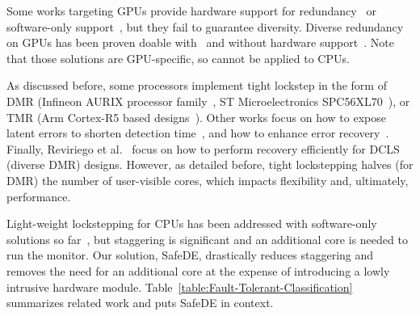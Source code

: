 Some works targeting GPUs provide hardware support for redundancy~\cite{inter-intra-workgroup,Jeon2012,Swapcodes,Nathan2015} or software-only support~\cite{softwareapproaches_gpgpureliability,inter-intra-workgroup,Jain2019}, but they fail to guarantee diversity. Diverse redundancy on GPUs has been proven doable with~\cite{SergiDATE} and without hardware support~\cite{SergiIOLTS}. Note that those solutions are GPU-specific, so cannot be applied to CPUs.

As discussed before, some processors implement tight lockstep in the form of DMR (Infineon AURIX processor family~\cite{infineon_aurix}, ST Microelectronics SPC56XL70~\cite{STlockstep}), or TMR (Arm Cortex-R5 based designs~\cite{Iturbe2019,paper1}).
Other works focus on how to expose latent errors to shorten detection time~\cite{TCAD}, and how to enhance error recovery~\cite{DATEcheckpointing}.
Finally, Reviriego et al.~\cite{DivDMR} focus on how to perform recovery efficiently for DCLS (diverse DMR) designs.
However, as detailed before, tight lockstepping halves (for DMR) the number of user-visible cores, which impacts flexibility and, ultimately, performance.

Light-weight lockstepping for CPUs has been addressed with software-only solutions so far~\cite{SergiDFT}, but staggering is significant and an additional core is needed to run the monitor. Our solution, SafeDE, drastically reduces staggering and removes the need for an additional core at the expense of introducing a lowly intrusive hardware module. Table~\ref{table:Fault-Tolerant-Classification} summarizes related work and puts SafeDE in context.